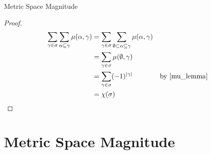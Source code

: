 \documentclass[12pt]{pom_thesis}
\begin{document}
\begin{chapter}{Metric Space Magnitude}
\begin{thm}
\end{thm}
\begin{proof}

\begin{align*}
\sum_{\gamma \in \sigma} \sum_{\alpha \subseteq \gamma} \mu(\alpha, \gamma) &= \sum_{\gamma \in \sigma} \sum_{\emptyset \subset \alpha \subseteq \gamma} \mu(\alpha, \gamma)\\
&= \sum_{\gamma \in \sigma} \mu(\emptyset, \gamma)\\
&= \sum_{\gamma \in \sigma} (-1)^{|\gamma|} &\text{by \ref{mu_lemma}}\\
&= \chi(\sigma)
\end{align*}
\end{proof}
\section{Metric Space Magnitude}

\end{chapter}


\end{document}
